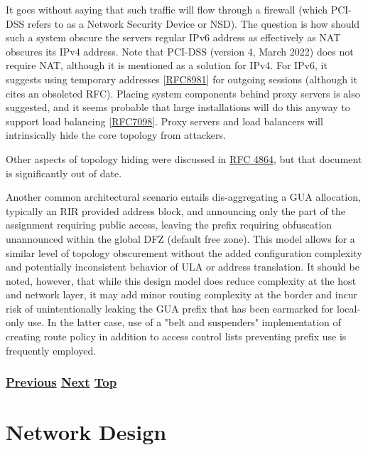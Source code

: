 \documentclass[
]{article}
\begin{document}
It goes without saying that such traffic will flow through a firewall
(which PCI-DSS refers to as a Network Security Device or NSD). The
question is how should such a system obscure the
server\textquotesingle s regular IPv6 address as effectively as NAT
obscures its IPv4 address. Note that PCI-DSS (version 4, March 2022)
does not require NAT, although it is mentioned as a solution for IPv4.
For IPv6, it suggests using temporary addresses
{[}\href{https://www.rfc-editor.org/info/rfc8981}{RFC8981}{]} for
outgoing sessions (although it cites an obsoleted RFC). Placing system
components behind proxy servers is also suggested, and it seems probable
that large installations will do this anyway to support load balancing
{[}\href{https://www.rfc-editor.org/info/rfc7098}{RFC7098}{]}. Proxy
servers and load balancers will intrinsically hide the core topology
from attackers.

Other aspects of topology hiding were discussed in
\href{https://www.rfc-editor.org/info/rfc4864}{RFC 4864}, but that
document is significantly out of date.

Another common architectural scenario entails dis-aggregating a GUA
allocation, typically an RIR provided address block, and announcing only
the part of the assignment requiring public access, leaving the prefix
requiring obfuscation unannounced within the global DFZ (default free
zone). This model allows for a similar level of topology obscurement
without the added configuration complexity and potentially inconsistent
behavior of ULA or address translation. It should be noted, however,
that while this design model does reduce complexity at the host and
network layer, it may add minor routing complexity at the border and
incur risk of unintentionally leaking the GUA prefix that has been
earmarked for local-only use. In the latter case, use of a "belt and
suspenders" implementation of creating route policy in addition to
access control lists preventing prefix use is frequently employed.

\subsubsection{\texorpdfstring{\hyperref[filtering]{Previous}
\hyperref[network-design]{Next}
\hyperref[security]{Top}}{Previous Next Top}}\label{previous-next-top-24}

\pagebreak

\section{Network Design}\label{network-design}
\end{document}

